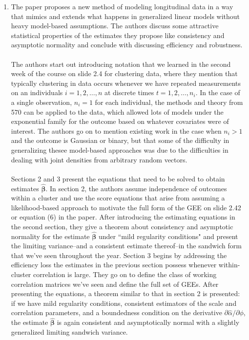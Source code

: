 \documentclass[11pt]{article}
\begin{document}
\begin{enumerate}
	\item 
	{
	The paper proposes a new method of modeling longitudinal data in a way that mimics and extends what happens in generalized linear models without heavy model-based assumptions. The authors discuss some attractive statistical properties of the estimates they propose like consistency and asymptotic normality and conclude with discussing efficiency and robustness.
	\\ \\ The authors start out introducing notation that we learned in the second week of the course on slide 2.4 for clustering data, where they mention that typically clustering in data occurs whenever we have repeated measurements on an individuals $i=1,2,\dotsc,n$ at discrete times $t=1,2,\dotsc,n_i$. In the case of a single observation, $n_i=1$ for each individual, the methods and theory from 570 can be applied to the data, which allowed lots of models under the exponential family for the outcome based on whatever covariates were of interest. The authors go on to mention existing work in the case when $n_i>1$ and the outcome is Gaussian or binary, but that some of the difficulty in generalizing thesee model-based approaches was due to the difficulties in dealing with joint densities from arbitrary random vectors. 
	\\ \\ Sections 2 and 3 present the equations that need to be solved to obtain estimates $\widehat{\bm{\beta}}$. In section 2, the authors assume independence of outcomes within a cluster and use the score equations that arise from assuming a likelihood-based approach to motivate the full form of the GEE on slide 2.42 or equation (6) in the paper. After introducing the estimating equations in the second section, they give a theorem about consistency and asymptotic normality for the estimate $\widehat{\bm{\beta}}$ under ``mild regularity conditions" and present the limiting variance--and a consistent estimate thereof--in the sandwich form that we've seen throughout the year. Section 3 begins by addressing the efficiency loss the estimates in the previous section possess whenever within-cluster correlation is large. They go on to define the class of working correlation matrices we've seen and define the full set of GEEs. After presenting the equations, a theorem similar to that in section 2 is presented: if we have mild regularity conditions, consistent estimators of the scale and correlation parameters, and a boundedness condition on the derivative $\partial \widehat{\alpha}/\partial \phi$, the estimate $\widehat{\bm{\beta}}$ is again consistent and asymptotically normal with a slightly generalized limiting sandwich variance. 
}
\end{enumerate}
\end{document}
